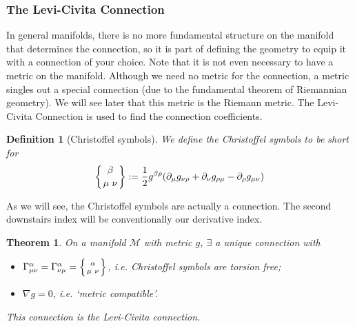 \documentclass[a4paper]{article}
\theoremstyle{new}
\newtheorem{defi}{Definition}[section]
\newtheorem{thm}{Theorem}[section]
\begin{document}
\subsubsection{The Levi-Civita Connection}
In general manifolds, there is no more fundamental structure on the manifold that determines the connection, so it is part of defining the geometry to equip it with a connection of your choice. Note that it is not even necessary to have a metric on the manifold. Although we need no metric for the connection, a metric singles out a special connection (due to the fundamental theorem of Riemannian geometry). We will see later that this metric is the Riemann metric. The Levi-Civita Connection is used to find the connection coefficients.
\begin{defi}[Christoffel symbols]
We define the Christoffel symbols to be short for
$$\left \{ {\beta \atop
\mu\ \nu}\right \}:=\frac{1}{2}g^{\beta\rho}(\partial_\mu g_{\nu\rho}+\partial_\nu g_{\rho\mu}-\partial_\rho g_{\mu\nu})$$
\end{defi}
As we will see, the Christoffel symbols are actually a connection. The second downstairs index will be conventionally our derivative index.
\begin{thm}
On a manifold $\mathcal{M}$ with metric $g$, $\exists$ a unique connection with
\begin{itemize}
    \item $\Gamma_{\mu\nu}^\alpha=\Gamma_{\nu\mu}^\alpha=\left \{ {\alpha \atop
\mu\ \nu}\right \}$, i.e. Christoffel symbols are torsion free;
    \item $\nabla g=0$, i.e. `metric compatible'.
\end{itemize}
This connection is the Levi-Civita connection.
\end{thm}
\end{document}
